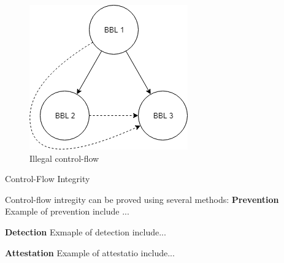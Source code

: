 \documentclass[final]{beamer}
\newlength{\onecolwid}
\newlength{\twocolwid}
\begin{document}
\begin{frame}[t]
\begin{columns}[t]
\begin{column}{\twocolwid}

\begin{columns}[t,totalwidth=\twocolwid] %

\begin{column}{\onecolwid}\vspace{-.6in} %

\begin{figure}
\includegraphics[width=\linewidth]{images/CFGIllegal.png}
\caption{Illegal control-flow}
\vspace{-1cm}
\end{figure}

\begin{block}{Control-Flow Integrity}

Control-flow intregity can be proved using several methods:
\textbf{Prevention} Example of prevention include ...

\textbf{Detection} Exmaple of detection include...

\textbf{Attestation} Example of attestatio include...
\end{block}


\end{column}
\end{columns}
\end{column}
\end{columns}
\end{frame}
\end{document}
